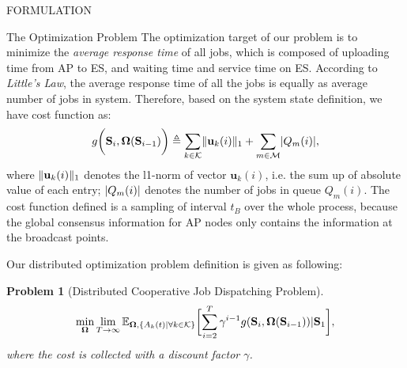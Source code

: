 \documentclass[10pt, conference, letterpaper]{IEEEtran}
\newtheorem{problem}{Problem}
\newcommand{\define}{\triangleq}
\renewcommand{\vec}{\mathbf}
\DeclarePairedDelimiter{\norm}{|}{|}
\DeclarePairedDelimiter{\Inorm}{\|}{\|_1}
\DeclarePairedDelimiter{\Bracket}{\bigg[}{\bigg]}
\newcommand{\apSet}{\mathcal{K}}
\newcommand{\esSet}{\mathcal{M}}
\newcommand{\Stat}{\mathbf{S}}
\newcommand{\Policy}{\mathbf{\Omega}}
\begin{document}
\begin{section}{FORMULATION}
        \begin{subsection}{The Optimization Problem}
            The optimization target of our problem is to minimize the \emph{average response time} of all jobs, which is composed of uploading time from AP to ES, and waiting time and service time on ES. According to \emph{Little's Law}, the average response time of all the jobs is equally as average number of jobs in system. Therefore, based on the system state definition, we have cost function as:
            \begin{align}
                g \bigg( \Stat_{i}, \Policy(\Stat_{i-1}) \bigg) \define \sum_{k\in\apSet} \Inorm{\vec{u}_{k}(i)} + \sum_{m\in\esSet} \norm{Q_m(i)},
            \end{align}
            where $\Inorm{\vec{u}_{k}(i)}$ denotes the l1-norm of vector $\vec{u}_{k}(i)$, i.e. the sum up of absolute value of each entry; $\norm{Q_m(i)}$ denotes the number of jobs in queue $Q_m(i)$. The cost function defined is a sampling of interval $t_B$ over the whole process, because the global consensus information for AP nodes only contains the information at the broadcast points.

            Our distributed optimization problem definition is given as following:
            \begin{problem}[Distributed Cooperative Job Dispatching Problem]
                \begin{gather}
                    \min_{\Policy} \lim_{T \to \infty}
                        \mathbb{E}_{\Policy, \{A_k(t)|\forall k\in\apSet\}}
                            \Bracket{\sum_{i=2}^{T} \gamma^{i-1} g(\Stat_{i}, \Policy(\Stat_{i-1}))|\Stat_1},
                \end{gather}
                where the cost is collected with a discount factor $\gamma$.
            \end{problem}


\end{subsection}
\end{section}
\end{document}
